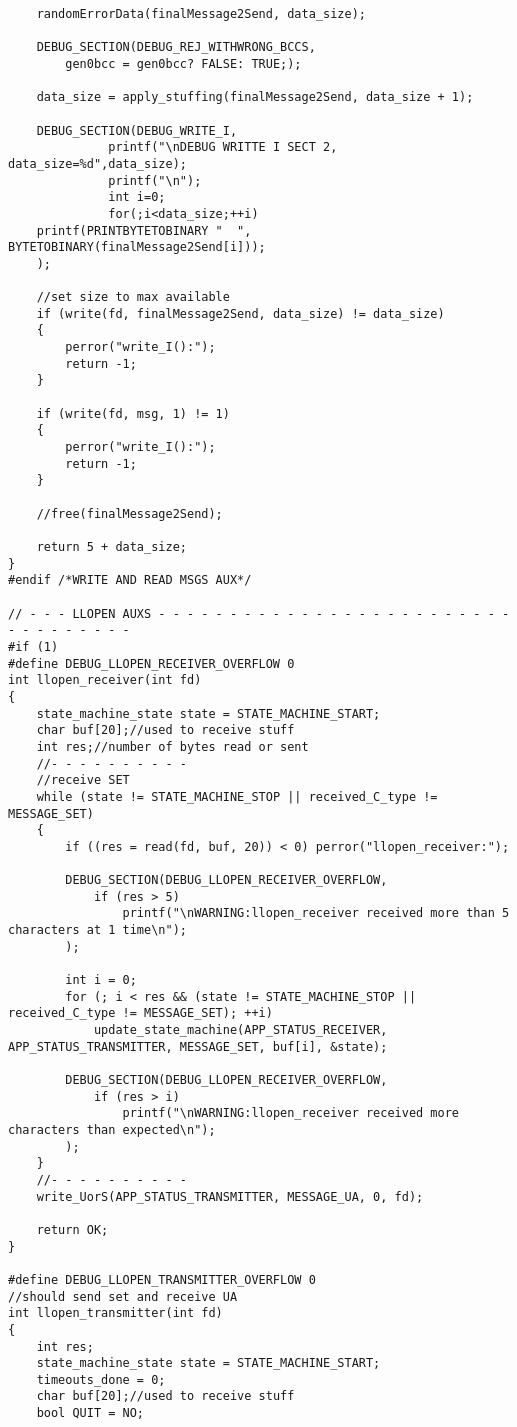 \begin{lstlisting}
	randomErrorData(finalMessage2Send, data_size);

	DEBUG_SECTION(DEBUG_REJ_WITHWRONG_BCCS,
		gen0bcc = gen0bcc? FALSE: TRUE;);

	data_size = apply_stuffing(finalMessage2Send, data_size + 1);

	DEBUG_SECTION(DEBUG_WRITE_I,
		      printf("\nDEBUG WRITTE I SECT 2, data_size=%d",data_size);
		      printf("\n");
		      int i=0;
		      for(;i<data_size;++i)
	printf(PRINTBYTETOBINARY "  ", BYTETOBINARY(finalMessage2Send[i]));
	);
	
	//set size to max available 
	if (write(fd, finalMessage2Send, data_size) != data_size)
	{
		perror("write_I():");
		return -1;
	}

	if (write(fd, msg, 1) != 1)
	{
		perror("write_I():");
		return -1;
	}

	//free(finalMessage2Send);

	return 5 + data_size;
}
#endif /*WRITE AND READ MSGS AUX*/

// - - - LLOPEN AUXS - - - - - - - - - - - - - - - - - - - - - - - - - - - - - - - - - -
#if (1)
#define DEBUG_LLOPEN_RECEIVER_OVERFLOW 0
int llopen_receiver(int fd)
{
	state_machine_state state = STATE_MACHINE_START;
	char buf[20];//used to receive stuff
	int res;//number of bytes read or sent
	//- - - - - - - - - -
	//receive SET
	while (state != STATE_MACHINE_STOP || received_C_type != MESSAGE_SET)
	{
		if ((res = read(fd, buf, 20)) < 0) perror("llopen_receiver:");

		DEBUG_SECTION(DEBUG_LLOPEN_RECEIVER_OVERFLOW,
			if (res > 5)
				printf("\nWARNING:llopen_receiver received more than 5 characters at 1 time\n");
		);

		int i = 0;
		for (; i < res && (state != STATE_MACHINE_STOP || received_C_type != MESSAGE_SET); ++i)
			update_state_machine(APP_STATUS_RECEIVER, APP_STATUS_TRANSMITTER, MESSAGE_SET, buf[i], &state);

		DEBUG_SECTION(DEBUG_LLOPEN_RECEIVER_OVERFLOW,
			if (res > i)
				printf("\nWARNING:llopen_receiver received more characters than expected\n");
		);
	}
	//- - - - - - - - - -
	write_UorS(APP_STATUS_TRANSMITTER, MESSAGE_UA, 0, fd);

	return OK;
}

#define DEBUG_LLOPEN_TRANSMITTER_OVERFLOW 0
//should send set and receive UA
int llopen_transmitter(int fd)
{
	int res;
	state_machine_state state = STATE_MACHINE_START;
	timeouts_done = 0;
	char buf[20];//used to receive stuff
	bool QUIT = NO;


\end{lstlisting}
